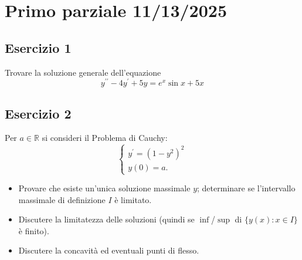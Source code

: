 \documentclass[a4paper, oneside]{book}
\begin{document}
\chapter{Primo parziale 11/13/2025}
\section{Esercizio 1}
Trovare la soluzione generale dell'equazione 
\[ y^{\prime\prime}-4y^{\prime}+5y=e^{x}\sin x+5x \] 



\section{Esercizio 2}
Per $a\in\mathbb{R}$ si consideri il Problema di Cauchy:
\[ \begin{cases}y^{\prime}=(1-y^{2})^{2}\\ y(0)=a.\end{cases} \] 
\begin{itemize}
    \item[(a)] Provare che esiste un'unica soluzione massimale $y$; determinare se l'intervallo massimale di definizione $I$ è limitato.
    \item[(b)] Discutere la limitatezza delle soluzioni (quindi se $\inf$/$\sup$ di $\{y(x):x\in I\}$ è finito).
    \item[(c)] Discutere la concavità ed eventuali punti di flesso.
\end{itemize}
\end{document}
